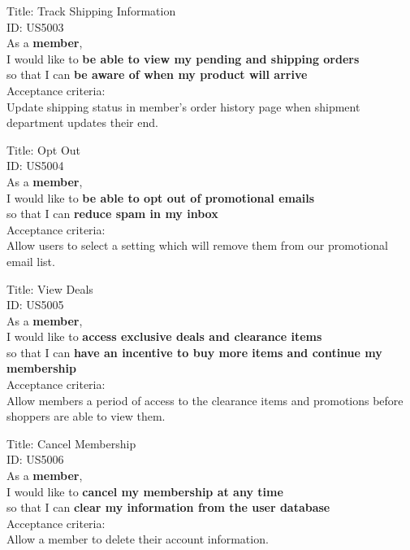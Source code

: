 \documentclass{article}
\begin{document}
\begin{framed}
\noindent
Title:  Track Shipping Information \\
ID: US5003 \\
As a \textbf{member},\\
 \textbullet  \quad \quad I would like to \textbf{be able to view my pending and shipping orders }\\ 
 \textbullet  \quad \quad so that I can \textbf{be aware of when my product will arrive}\\
 Acceptance criteria: \\
  \textbullet  \quad \quad Update shipping status in member's order history page when shipment department updates their end.
\end{framed}

\begin{framed}
\noindent
Title:  Opt Out \\
ID: US5004 \\
As a \textbf{member},\\
\textbullet  \quad \quad I would like to \textbf{be able to opt out of promotional emails}\\ 
\textbullet  \quad \quad so that I can \textbf{reduce spam in my inbox}\\
Acceptance criteria: \\
\textbullet  \quad \quad Allow users to select a setting which will remove them from our promotional email list.
\end{framed}


\begin{framed}
\noindent
Title:  View Deals \\
ID: US5005 \\
As a \textbf{member},\\
\textbullet  \quad \quad I would like to \textbf{access exclusive deals and clearance items}\\ 
\textbullet  \quad \quad so that I can \textbf{have an incentive to buy more items and continue my membership}\\
Acceptance criteria: \\
\textbullet  \quad \quad Allow members a period of access to the clearance items and promotions before shoppers are able to view them.
\end{framed}


\begin{framed}
\noindent
Title:  Cancel Membership \\
ID: US5006 \\
As a \textbf{member},\\
\textbullet  \quad \quad I would like to \textbf{cancel my membership at any time}\\ 
\textbullet  \quad \quad so that I can \textbf{clear my information from the user database}\\
Acceptance criteria: \\
\textbullet  \quad \quad Allow a member to delete their account information.
\end{framed}
\end{document}
